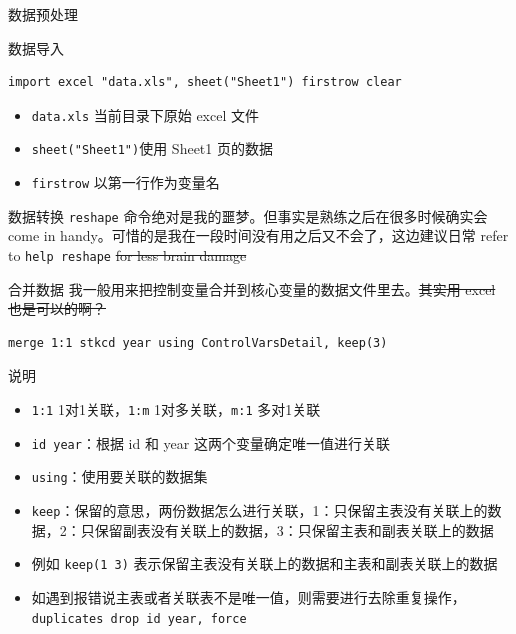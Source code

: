 \documentclass[
  ignorenonframetext,
  aspectratio=169,
  fontset=ubuntu]{ctexbeamer}
\providecommand{\tightlist}{%
  \setlength{\itemsep}{0pt}\setlength{\parskip}{0pt}}
\providecommand{\st}[1]{\CJKsout{#1}}
\renewcommand{\st}[1]{\sout{#1}}
\begin{document}
\begin{frame}[fragile]{数据预处理}
\label{ux6570ux636eux9884ux5904ux7406}
\begin{block}{数据导入}
\label{ux6570ux636eux5bfcux5165}
\begin{verbatim}
import excel "data.xls", sheet("Sheet1") firstrow clear
\end{verbatim}

\begin{itemize}
\tightlist
\item
  \texttt{data.xls} 当前目录下原始 excel 文件
\item
  \texttt{sheet("Sheet1")}使用 Sheet1 页的数据
\item
  \texttt{firstrow} 以第一行作为变量名
\end{itemize}
\end{block}

\begin{block}{数据转换}
\label{ux6570ux636eux8f6cux6362}
\texttt{reshape}
命令绝对是我的噩梦。但事实是熟练之后在很多时候确实会 come in
handy。可惜的是我在一段时间没有用之后又不会了，这边建议日常 refer to
\texttt{help reshape} \st{for less brain damage}
\end{block}

\begin{block}{合并数据}
\label{ux5408ux5e76ux6570ux636e}
我一般用来把控制变量合并到核心变量的数据文件里去。\st{其实用 excel
也是可以的啊？}

\begin{verbatim}
merge 1:1 stkcd year using ControlVarsDetail, keep(3)
\end{verbatim}
\end{block}
\end{frame}

\begin{frame}[fragile]{说明}
\label{ux8bf4ux660e}
\begin{itemize}
\tightlist
\item
  \texttt{1:1} 1对1关联，\texttt{1:m}
  1对多关联，\texttt{m:1} 多对1关联
\item
  \texttt{id year}：根据 id 和 year
  这两个变量确定唯一值进行关联
\item
  \texttt{using}：使用要关联的数据集
\item
  \texttt{keep}：保留的意思，两份数据怎么进行关联，1：只保留主表没有关联上的数据，2：只保留副表没有关联上的数据，3：只保留主表和副表关联上的数据
\item
  例如 \texttt{keep(1 3)}
  表示保留主表没有关联上的数据和主表和副表关联上的数据
\item
  如遇到报错说主表或者关联表不是唯一值，则需要进行去除重复操作，\texttt{duplicates drop id year, force}
\end{itemize}
\end{frame}
\end{document}
